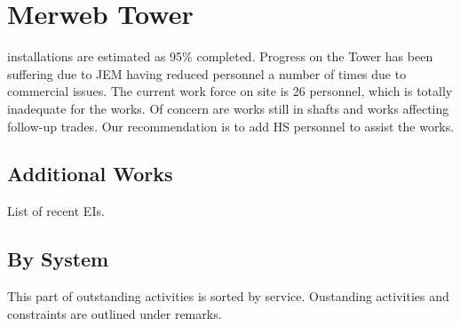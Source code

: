 \chapter{Merweb Tower}

 installations are estimated as 95\% completed. Progress on the Tower has been suffering due to JEM having reduced personnel a number of times due to commercial issues. The current work force on site is 26 personnel, which is totally inadequate for the works.
Of concern are works still in shafts and works affecting follow-up trades. Our recommendation is to add HS personnel to assist the works.


\section{Additional Works}

List of recent EIs.




\section{By System}
This part of outstanding activities is sorted by service. Oustanding activities and constraints are outlined under remarks. 
\bigskip

